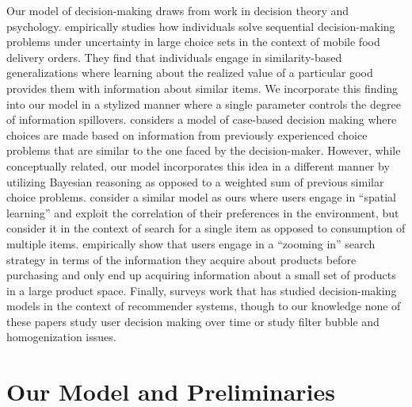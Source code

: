\documentclass[format=acmsmall, review=false]{acmart}
\begin{document}
\par 
Our model of decision-making draws from work in decision theory and psychology. \cite{schulz2019structured} empirically studies how individuals solve sequential decision-making problems under uncertainty in large choice sets in the context of mobile food delivery orders. They find that individuals engage in similarity-based generalizations where learning about the realized value of a particular good provides them with information about similar items. We incorporate this finding into our model in a stylized manner where a single parameter controls the degree of information spillovers. \cite{gilboa1995case} considers a model of case-based decision making where choices are made based on information from previously experienced choice problems that are similar to the one faced by the decision-maker. However, while conceptually related, our model incorporates this idea in a different manner by utilizing Bayesian reasoning as opposed to a weighted sum of previous similar choice problems. \cite{hodgson2019horse} consider a similar model as ours where users engage in ``spatial learning'' and exploit the correlation of their preferences in the environment, but consider it in the context of search for a single item as opposed to consumption of multiple items. \cite{bronnenberg2016zooming} empirically show that users engage in a ``zooming in” search strategy in terms of the information they acquire about products before purchasing and only end up acquiring information about a small set of products in a large product space. Finally, \cite{chen2013human} surveys work that has studied decision-making models in the context of recommender systems, though to our knowledge none of these papers study user decision making over time or study filter bubble and homogenization issues.


\section{Our Model and Preliminaries}
\end{document}
